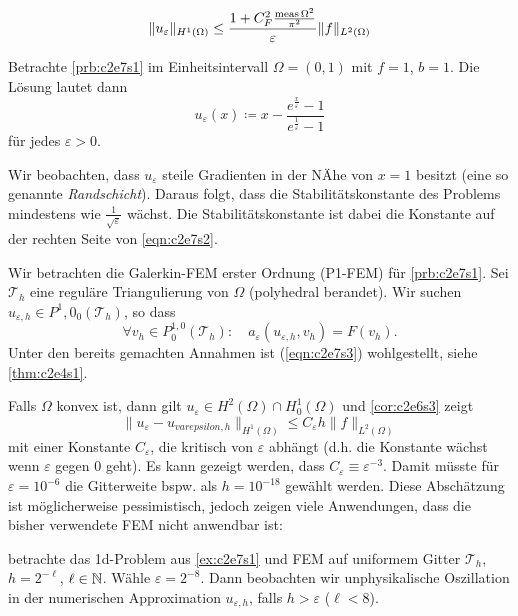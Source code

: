 \documentclass[../skript.tex]{subfiles}
\begin{document}
\begin{equation}\label{eqn:c2e7s2}
	\| u_\varepsilon\|_{H^1(\Omega)} \leq \frac{1+C_F^2\frac{\operatorname{meas}{\Omega}^2}{\pi^2}}{\varepsilon}\|f\|_{L^2(\Omega)}
\end{equation}
\begin{example}\label{ex:c2e7s1}
	Betrachte \cref{prb:c2e7s1} im Einheitsintervall $\Omega=(0,1)$ mit $f=1$, $b=1$. Die Lösung lautet dann
	\[
		u_\varepsilon(x)\coloneqq x-\frac{e^{\frac{x}{\varepsilon}}-1}{e^{\frac{1}{\varepsilon}}-1}
	\]
	für jedes $\varepsilon > 0$.\par
	Wir beobachten, dass $u_\varepsilon$ steile Gradienten in der NÄhe von $x=1$ besitzt (eine so genannte \emph{Randschicht}).
	Daraus folgt, dass die Stabilitätskonstante des Problems mindestens wie $\frac{1}{\sqrt{\varepsilon}}$ wächst. Die Stabilitätskonstante ist dabei die Konstante auf der rechten Seite von \cref{eqn:c2e7s2}.
\end{example}
Wir betrachten die Galerkin-FEM erster Ordnung (P1-FEM) für \cref{prb:c2e7s1}. Sei $\mathcal{T}_h$ eine reguläre Triangulierung von $\Omega$ (polyhedral berandet). Wir suchen $u_{\varepsilon,h}\in P^1,0_0(\mathcal{T}_h)$, so dass 
\begin{equation}\label{eqn:c2e7s3}
	\forall v_h\in P^{1,0}_0(\mathcal{T}_h):\quad a_\varepsilon(u_{\varepsilon,h},v_h) = F(v_h).
\end{equation}
Unter den bereits gemachten Annahmen ist (\ref{eqn:c2e7s3}) wohlgestellt, siehe \cref{thm:c2e4s1}.\par
Falls $\Omega$ konvex ist, dann gilt $u_\varepsilon\in H^2(\Omega)\cap H^1_0(\Omega)$ und \cref{cor:c2e6s3} zeigt
\[
	\|u_\varepsilon-u_{varepsilon,h}\|_{H^1(\Omega)} \leq C_\varepsilon h\|f\|_{L^2(\Omega)}
\]
mit einer Konstante $C_\varepsilon$, die kritisch von $\varepsilon$ abhängt (d.h. die Konstante wächst wenn $\varepsilon$ gegen 0 geht). Es kann gezeigt werden, dass $C_\varepsilon \equiv \varepsilon^{-3}$. Damit müsste für $\varepsilon = 10^{-6}$ die Gitterweite bspw. als $h = 10^{-18}$ gewählt werden. Diese Abschätzung ist möglicherweise pessimistisch, jedoch zeigen viele Anwendungen, dass die bisher verwendete FEM nicht anwendbar ist:
\begin{example}\label{ex:c2e7s2}
	betrachte das 1d-Problem aus \cref{ex:c2e7s1} und FEM auf uniformem Gitter $\mathcal{T}_h$, $h=2^{-\ell}$, $\ell\in\mathbb{N}$. Wähle $\varepsilon = 2^{-8}$. Dann beobachten wir unphysikalische Oszillation in der numerischen Approximation $u_{\varepsilon,h}$, falls $h > \varepsilon$ ($\ell < 8$).
\end{example}
\end{document}
